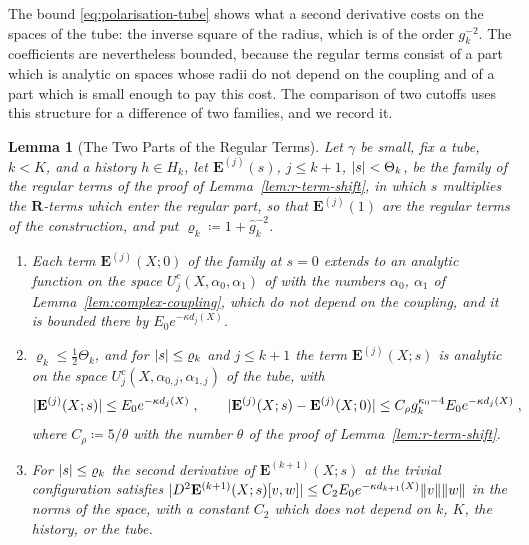 \documentclass[11pt]{preprint}
\DeclarePairedDelimiter{\abs}{\lvert}{\rvert}
\DeclarePairedDelimiter{\norm}{\lVert}{\rVert}
\numberwithin{equation}{section}
\newtheorem{lemma}{Lemma}[section]
\theoremstyle{definition}
\theoremstyle{remark}
\theoremstyle{plain}
\begin{document}
The bound \eqref{eq:polarisation-tube} shows what a second derivative costs on the spaces of the tube: the inverse square of the radius, which is of the order $g_k^{-2}$. The coefficients are nevertheless bounded, because the regular terms consist of a part which is analytic on spaces whose radii do not depend on the coupling and of a part which is small enough to pay this cost. The comparison of two cutoffs uses this structure for a difference of two families, and we record it.

\begin{lemma}[The Two Parts of the Regular Terms]\label{lem:two-parts}
Let $\gamma$ be small, fix a tube, $k < K$, and a history $h \in H_k$, let $\mathbf E^{(j)}(s)$, $j \leq k + 1$, $\abs s < \Theta_k$, be the family of the regular terms of the proof of Lemma~\ref{lem:r-term-shift}, in which $s$ multiplies the $\mathbf R$-terms which enter the regular part, so that $\mathbf E^{(j)}(1)$ are the regular terms of the construction, and put $\varrho_k \coloneqq 1 + \hat g_k^{-2}$.
\begin{enumerate}[label=(\alph*)]
\item Each term $\mathbf E^{(j)}(X; 0)$ of the family at $s = 0$ extends to an analytic function on the space $U^c_j(X, \alpha_0, \alpha_1)$ of \cite[(1.10)--(1.16), p.~262]{BalabanRG1} with the numbers $\alpha_0$, $\alpha_1$ of Lemma~\ref{lem:complex-coupling}, which do not depend on the coupling, and it is bounded there by $E_0e^{-\kappa d_j(X)}$.
\item $\varrho_k \leq \frac12\Theta_k$, and for $\abs s \leq \varrho_k$ and $j \leq k + 1$ the term $\mathbf E^{(j)}(X; s)$ is analytic on the space $U^c_j(X, \alpha_{0,j}, \alpha_{1,j})$ of the tube, with
\begin{equation}\label{eq:two-parts}
    \abs{\mathbf E^{(j)}(X; s)} \leq E_0e^{-\kappa d_j(X)}\;,
    \qquad
    \abs{\mathbf E^{(j)}(X; s) - \mathbf E^{(j)}(X; 0)} \leq C_\rho g_k^{\kappa_0-4}E_0e^{-\kappa d_j(X)}\;,
\end{equation}
where $C_\rho \coloneqq 5/\theta$ with the number $\theta$ of the proof of Lemma~\ref{lem:r-term-shift}.
\item For $\abs s \leq \varrho_k$ the second derivative of $\mathbf E^{(k+1)}(X; s)$ at the trivial configuration satisfies $\abs{D^2\mathbf E^{(k+1)}(X; s)[v, w]} \leq C_2E_0e^{-\kappa d_{k+1}(X)}\norm v\norm w$ in the norms of the space, with a constant $C_2$ which does not depend on $k$, $K$, the history, or the tube.
\end{enumerate}
\end{lemma}
\end{document}
